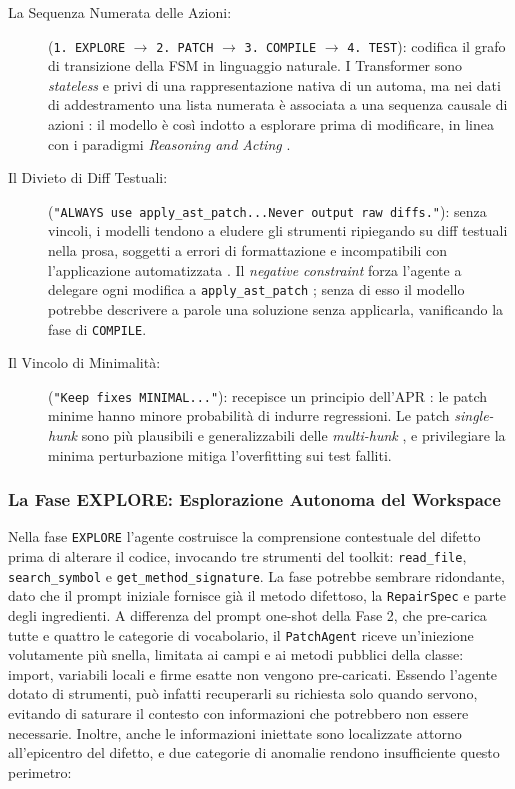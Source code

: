 \begin{description}
    \item[La Sequenza Numerata delle Azioni:]
    (\texttt{1.\ EXPLORE} $\rightarrow$ \texttt{2.\ PATCH} $\rightarrow$ \texttt{3.\ COMPILE} $\rightarrow$ \texttt{4.\ TEST}):
    codifica il grafo di transizione della FSM in linguaggio naturale. I Transformer sono \textit{stateless} e privi
    di una rappresentazione nativa di un automa, ma nei dati di addestramento una lista
    numerata è associata a una sequenza causale di azioni \cite{wang2023plan}: il modello è così indotto a esplorare
    prima di modificare, in linea con i paradigmi \textit{Reasoning and Acting} \cite{yao2022react}.

    \item[Il Divieto di Diff Testuali:]
    (\texttt{"ALWAYS use apply\_ast\_patch...Never output raw diffs."}):
    senza vincoli, i modelli tendono a eludere gli strumenti ripiegando su diff testuali nella prosa, soggetti a
    errori di formattazione e incompatibili con l'applicazione automatizzata \cite{jimenez2024sweagent}. Il
    \textit{negative constraint} forza l'agente a delegare ogni modifica a \texttt{apply\_ast\_patch}
    \cite{qin2023toolllm}; senza di esso il modello potrebbe descrivere a parole una soluzione senza applicarla,
    vanificando la fase di \texttt{COMPILE}.

    \item[Il Vincolo di Minimalità:]
    (\texttt{"Keep fixes MINIMAL..."}):
    recepisce un principio dell'APR \cite{huang2024evolving}: le patch minime hanno minore probabilità di indurre
    regressioni. Le patch \textit{single-hunk} sono più plausibili e generalizzabili delle \textit{multi-hunk}
    \cite{xia2024fitrepair}, e privilegiare la minima perturbazione mitiga l'overfitting sui test falliti.
\end{description}


\subsubsection{La Fase EXPLORE: Esplorazione Autonoma del Workspace}
\label{subsubsec:3.4.2.2}
Nella fase \texttt{EXPLORE} l'agente costruisce la comprensione contestuale del difetto prima di alterare il
codice, invocando tre strumenti del toolkit: \texttt{read\_file}, \texttt{search\_symbol} e
\texttt{get\_method\_signature}. La fase potrebbe sembrare ridondante, dato che il prompt iniziale fornisce già il
metodo difettoso, la \texttt{RepairSpec} e parte degli ingredienti. A differenza del prompt one-shot della Fase 2, 
che pre-carica tutte e quattro le categorie di vocabolario, il \texttt{PatchAgent} riceve un'iniezione
volutamente più snella, limitata ai campi e ai metodi pubblici della classe: import, variabili locali e firme
esatte non vengono pre-caricati. Essendo l'agente dotato di strumenti, può infatti recuperarli su richiesta solo
quando servono, evitando di saturare il contesto con informazioni che potrebbero non essere necessarie. Inoltre, anche le informazioni iniettate sono
localizzate attorno all'epicentro del difetto, e due categorie di anomalie rendono insufficiente questo perimetro:

